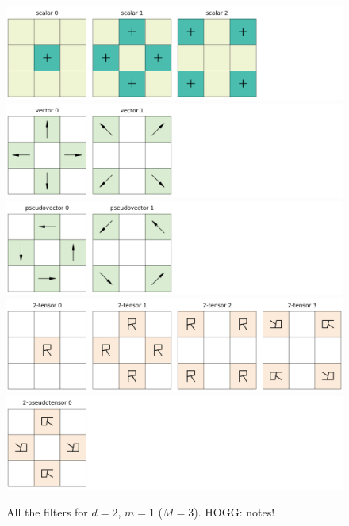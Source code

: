 \documentclass{article}
\theoremstyle{plain}
\begin{document}
\begin{figure}[tp]
  \begin{mdframed}
  \color{captiongray}
  \begin{center}
\includegraphics[width=\textwidth]{notebooks/filter+0_2_3.png}\\
\includegraphics[width=\textwidth]{notebooks/filter+1_2_3.png}\\
\includegraphics[width=\textwidth]{notebooks/filter-1_2_3.png}
\includegraphics[width=\textwidth]{notebooks/filter+2_2_3.png}\\
\includegraphics[width=\textwidth]{notebooks/filter-2_2_3.png}
  \end{center}
\caption{All the filters for $d=2$, $m=1$ ($M=3$). HOGG: notes!\label{fig:filters23}}
  \end{mdframed}
\end{figure}
\end{document}
